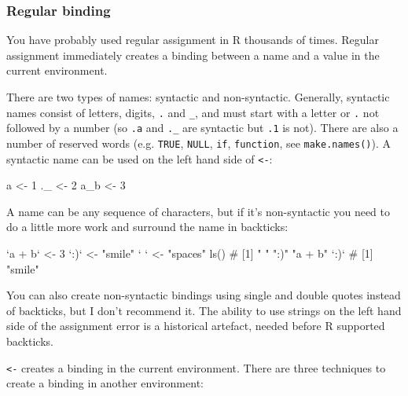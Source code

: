 \documentclass[oneside]{book}
\newenvironment{Shaded}{}{}
\newcommand{\KeywordTok} [1]{\textcolor[rgb]{0.00,0.44,0.13}{{#1}}}
\newcommand{\DataTypeTok}[1]{\textcolor[rgb]{0.56,0.13,0.00}{{#1}}}
\newcommand{\DecValTok}  [1]{\textcolor[rgb]{0.25,0.63,0.44}{{#1}}}
\newcommand{\StringTok}  [1]{\textcolor[rgb]{0.25,0.44,0.63}{{#1}}}
\newcommand{\CommentTok} [1]{\textcolor[rgb]{0.38,0.63,0.69}{{#1}}}
\newcommand{\NormalTok}  [1]{{#1}}
\begin{document}
\subsubsection{Regular binding}\label{regular-binding}

You have probably used regular assignment in R thousands of times.
Regular assignment immediately creates a binding between a name and a
value in the current environment.

There are two types of names: syntactic and non-syntactic. Generally,
syntactic names consist of letters, digits, \texttt{.} and \texttt{\_},
and must start with a letter or \texttt{.} not followed by a number (so
\texttt{.a} and \texttt{.\_} are syntactic but \texttt{.1} is not).
There are also a number of reserved words (e.g. \texttt{TRUE},
\texttt{NULL}, \texttt{if}, \texttt{function}, see
\texttt{make.names()}). A syntactic name can be used on the left hand
side of \texttt{\textless{}-}:

\begin{Shaded}
\begin{Highlighting}[]
\NormalTok{a <-}\StringTok{ }\DecValTok{1}
\NormalTok{._ <-}\StringTok{ }\DecValTok{2}
\NormalTok{a_b <-}\StringTok{ }\DecValTok{3}
\end{Highlighting}
\end{Shaded}

A name can be any sequence of characters, but if it's non-syntactic you
need to do a little more work and surround the name in backticks:

\begin{Shaded}
\begin{Highlighting}[]
\StringTok{`}\DataTypeTok{a + b}\StringTok{`} \NormalTok{<-}\StringTok{ }\DecValTok{3}
\StringTok{`}\DataTypeTok{:)}\StringTok{`} \NormalTok{<-}\StringTok{ "smile"}
\StringTok{`}\DataTypeTok{    }\StringTok{`} \NormalTok{<-}\StringTok{ "spaces"}
\KeywordTok{ls}\NormalTok{()}
\CommentTok{#  [1] "    "   ":)"     "a + b"}
\StringTok{`}\DataTypeTok{:)}\StringTok{`}
\CommentTok{#  [1] "smile"}
\end{Highlighting}
\end{Shaded}

You can also create non-syntactic bindings using single and double
quotes instead of backticks, but I don't recommend it. The ability to
use strings on the left hand side of the assignment error is a
historical artefact, needed before R supported backticks.

\texttt{\textless{}-} creates a binding in the current environment.
There are three techniques to create a binding in another environment:
\end{document}
